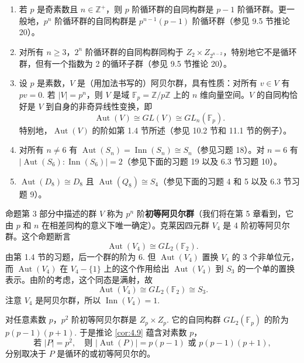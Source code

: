 \begin{proposition}\label{pro:4.17}
\begin{enumerate}[label=(\arabic*)]
\item 若 \(p\) 是奇素数且 \(n \in \mathbb{Z}^+\)，则 \(p\) 阶循环群的自同构群是 \(p-1\) 阶循环群。更一般地，\(p^n\) 阶循环群的自同构群是 \(p^{n-1}(p-1)\) 阶循环群（参见 9.5 节推论 20）。

\item 对所有 \(n \geq 3\)，\(2^n\) 阶循环群的自同构群同构于 \(Z_2 \times Z_{2^{n-2}}\)，特别地它不是循环群，但有一个指数为 2 的循环子群（参见 9.5 节推论 20）。

\item 设 \(p\) 是素数，\(V\) 是（用加法书写的）阿贝尔群，具有性质：对所有 \(v \in V\) 有 \(pv = 0\). 若 \(|V| = p^n\)，则 \(V\) 是域 \(\mathbb{F}_p = \mathbb{Z}/p\mathbb{Z}\) 上的 \(n\) 维向量空间。\(V\) 的自同构恰好是 \(V\) 到自身的非奇异线性变换，即
\[
\operatorname{Aut}(V) \cong GL(V) \cong GL_n(\mathbb{F}_p).
\]
特别地，\(\operatorname{Aut}(V)\) 的阶如第 1.4 节所述（参见 10.2 节和 11.1 节的例子）。

\item 对所有 \(n \neq 6\) 有 \(\operatorname{Aut}(S_n) = \operatorname{Inn}(S_n) \cong S_n\)（参见习题 18）。对 \(n = 6\) 有 \(|\operatorname{Aut}(S_6) : \operatorname{Inn}(S_6)| = 2\)（参见下面的习题 19 以及 6.3 节习题 10）。

\item \(\operatorname{Aut}(D_8) \cong D_8\) 且 \(\operatorname{Aut}(Q_8) \cong S_4\)（参见下面的习题 4 和 5 以及 6.3 节习题 9）。
\end{enumerate}
\end{proposition}

命题第 3 部分中描述的群 \(V\) 称为 \(p^n\) 阶\textbf{初等阿贝尔群}（我们将在第 5 章看到，它由 \(p\) 和 \(n\) 在相差同构的意义下唯一确定）。克莱因四元群 \(V_4\) 是 4 阶初等阿贝尔群。这个命题断言
\[
\operatorname{Aut}(V_4) \cong GL_2(\mathbb{F}_2).
\]
由第 1.4 节的习题，后一个群的阶为 6. 但 \(\operatorname{Aut}(V_4)\) 置换 \(V_4\) 的 3 个非单位元，而 \(\operatorname{Aut}(V_4)\) 在 \(V_4 - \{1\}\) 上的这个作用给出 \(\operatorname{Aut}(V_4)\) 到 \(S_3\) 的一个单的置换表示。由阶的考虑，这个同态是满射，故
\[
\operatorname{Aut}(V_4) \cong GL_2(\mathbb{F}_2) \cong S_3.
\]
注意 \(V_4\) 是阿贝尔群，所以 \(\operatorname{Inn}(V_4) = 1\).

对任意素数 \(p\)，\(p^2\) 阶初等阿贝尔群是 \(Z_p \times Z_p\). 它的自同构群 \(GL_2(\mathbb{F}_p)\) 的阶为 \(p(p-1)(p+1)\). 于是推论 \ref{cor:4.9} 蕴含对素数 \(p\)，
\[
\text{若 } |P| = p^2,\quad \text{则 } |\operatorname{Aut}(P)| = p(p-1) \text{ 或 } p(p-1)(p+1),
\]
分别取决于 \(P\) 是循环的或初等阿贝尔的。

